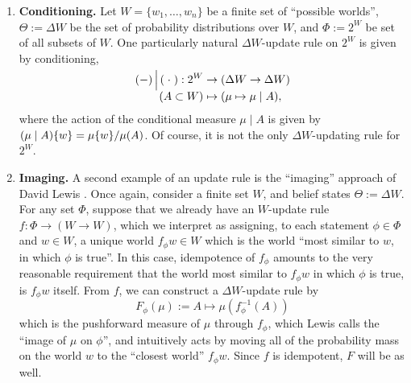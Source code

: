 \documentclass{article}
\begin{document}
\begin{enumerate}
    \item %
    \textbf{Conditioning.}
    Let $W = \{w_1, \ldots, w_n\}$ be a finite set of ``possible worlds'',
    $\Theta := \Delta W$ be the set of probability distributions over $W$,
    and $\Phi := 2^W$ be set of all subsets of $W$.
    One particularly natural $\Delta W$-update rule on $2^W$ is given by conditioning,
    \begin{align*}
        (-) \smash{\,\Big|\,} (\;\cdot\;) : 2^W &\to (\Delta W \to \Delta W) \\
        (A \subset W) &\mapsto (  \mu \mapsto \mu \mid A ),
    \end{align*}
    where the action of the conditional measure $\mu\mid A$ is given by $(\mu \mid A) \{w\} = {\mu\{w\}}/{\mu(A)}$.
    Of course, it is not the only $\Delta W$-updating rule for $2^W$.

    \item
    \textbf{Imaging.}
    A second example of an update rule is the ``imaging'' approach of David Lewis
    \parencite{lewis1976probabilities}.
    Once again, consider a finite set $W$, and belief states $\Theta := \Delta W$.
    For any set $\Phi$, suppose that we already have an $W$-update rule
    $f : \Phi \to (W \to W)$, which we interpret as assigning, to each statement $\phi \in \Phi$ and $w \in W$, a unique world $f_\phi w \in W$ which is the world ``most similar to $w$, in which $\phi$ is true''.
    In this case, idempotence of $f_\phi$ amounts to the very reasonable requirement that the world most similar to $f_\phi w$ in which $\phi$ is true, is $f_\phi w$ itself.
    From $f$, we can construct a $\Delta W$-update rule by
    \[
        F_\phi(\mu) :=  A \mapsto \mu( f^{-1}_\phi( A ))
    \]
    which is the pushforward measure of $\mu$ through $f_\phi$, which Lewis calls the ``image of $\mu$ on $\phi$'', and intuitively acts by moving all of the probability mass on the world $w$ to the ``closest world'' $f_\phi w$.
    Since $f$ is idempotent, $F$ will be as well.

    
\end{enumerate}
\end{document}
